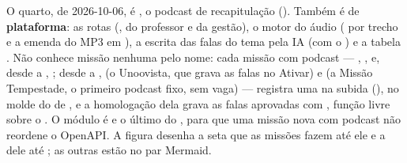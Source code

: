 O quarto, de 2026-10-06, é , o podcast de recapitulação
(). Também é de \textbf{plataforma}: as rotas
(, do professor e da gestão), o motor do áudio
( por trecho e a emenda do MP3 em ), a
escrita das falas do tema pela IA (com o ) e a tabela
. Não conhece missão nenhuma pelo nome: cada missão com
podcast --- , ,  e,
desde a , ; desde a ,
 (o Unoovista, que grava as falas no Ativar) e 
(a Missão Tempestade, o primeiro podcast fixo, sem vaga) ---
registra uma  na subida (),
no molde do  de , e a homologação dela
grava as falas aprovadas com , função livre sobre o
. O módulo é  e o último do , para que uma
missão nova com podcast não reordene o OpenAPI. A figura desenha a seta que as
missões fazem até ele e a dele até ; as outras estão no par Mermaid.

